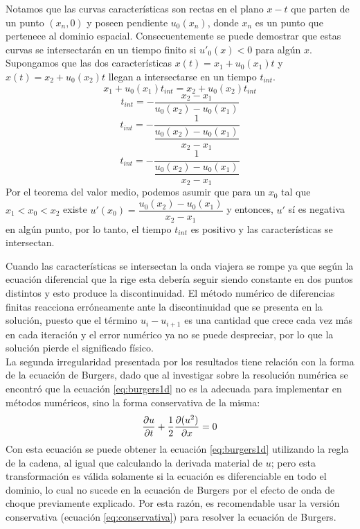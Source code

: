\documentclass[12pt]{article}
\begin{document}
	Notamos que las curvas características son rectas en el plano $x-t$ que parten de un punto $(x_{n}, 0)$ y poseen pendiente $u_{0}(x_n)$, donde $x_n$ es un punto que pertenece al dominio espacial. Consecuentemente se puede demostrar que estas curvas se intersectarán en un tiempo finito si $u'_{0}(x) < 0$ para algún $x$. Supongamos que las dos características $x(t) = x_{1}+u_{0}(x_1)t$ y $x(t) = x_{2}+u_{0}(x_2)t$ llegan a intersectarse en un tiempo $t_{int}$.
	\begin{equation}
		x_{1}+u_{0}(x_1)t_{int} = x_{2}+u_{0}(x_2)t_{int}
	\end{equation}
	\begin{equation}
		t_{int} = -\frac{x_2-x_1}{u_{0}(x_2) - u_{0}(x_1)}
	\end{equation}
	\begin{equation}
		t_{int} = -\dfrac{1}{\dfrac{u_{0}(x_2) - u_{0}(x_1)}{x_2-x_1}}
	\end{equation}
	\begin{equation}
		t_{int} = -\dfrac{1}{\dfrac{u_{0}(x_2) - u_{0}(x_1)}{x_2-x_1}}
	\end{equation}
	Por el teorema del valor medio, podemos asumir que para un $x_0$ tal que $x_1 < x_0 < x_2$ existe $u'(x_0)=\dfrac{u_{0}(x_2) - u_{0}(x_1)}{x_2-x_1}$ y entonces, $u'$ sí es negativa en algún punto, por lo tanto, el tiempo $t_{int}$ es positivo y las características se intersectan.
	
	Cuando las características se intersectan la onda viajera se rompe ya que según la ecuación diferencial que la rige esta debería seguir siendo constante en dos puntos distintos y esto produce la discontinuidad. El método numérico de diferencias finitas reacciona erróneamente ante la discontinuidad que se presenta en la solución, puesto que el término $u_{i}-u_{i+1}$ es una cantidad que crece cada vez más en cada iteración y el error numérico ya no se puede despreciar, por lo que la solución pierde el significado físico.
	\\
	La segunda irregularidad presentada por los resultados tiene relación con la forma de la ecuación de Burgers, dado que al investigar sobre la resolución numérica se encontró que la ecuación \ref{eq:burgers1d} no es la adecuada para implementar en métodos numéricos, sino la forma conservativa de la misma:
	\begin{equation}
		\pdv{u}{t} + \frac{1}{2}\pdv{(u^2)}{x} = 0
		\label{eq:conservativa}
	\end{equation}
	Con esta ecuación se puede obtener la ecuación \ref{eq:burgers1d} utilizando la regla de la cadena, al igual que calculando la derivada material de $u$; pero esta transformación es válida solamente si la ecuación es diferenciable en todo el dominio, lo cual no sucede en la ecuación de Burgers por el efecto de onda de choque previamente explicado. Por esta razón, es recomendable usar la versión conservativa (ecuación \ref{eq:conservativa}) para resolver la ecuación de Burgers.
	
\end{document}
